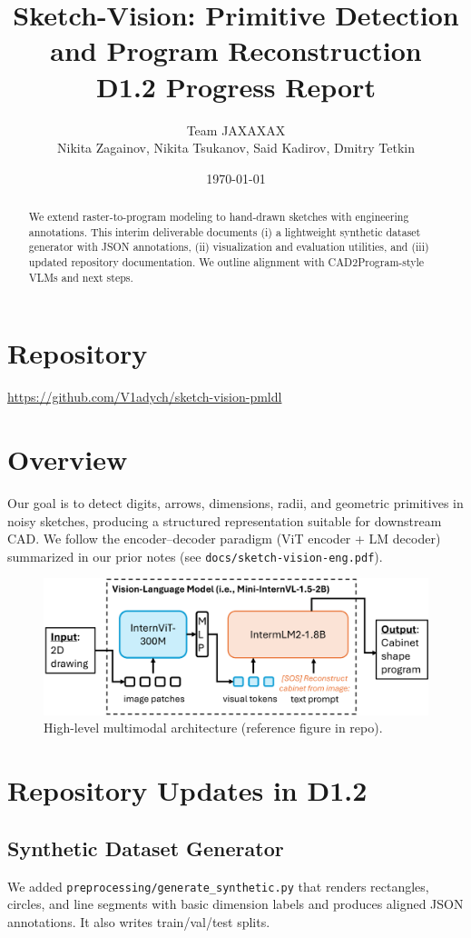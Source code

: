 \documentclass[11pt,a4paper]{article}
\title{Sketch-Vision: Primitive Detection and Program Reconstruction\\\large D1.2 Progress Report}
\author{Team JAXAXAX\\Nikita Zagainov, Nikita Tsukanov, Said Kadirov, Dmitry Tetkin}
\date{\today}
\begin{document}
\maketitle

\begin{abstract}
We extend raster-to-program modeling to hand-drawn sketches with engineering annotations. This interim deliverable documents (i) a lightweight synthetic dataset generator with JSON annotations, (ii) visualization and evaluation utilities, and (iii) updated repository documentation. We outline alignment with CAD2Program-style VLMs and next steps.
\end{abstract}

\section{Repository}
\url{https://github.com/V1adych/sketch-vision-pmldl}

\section{Overview}
Our goal is to detect digits, arrows, dimensions, radii, and geometric primitives in noisy sketches, producing a structured representation suitable for downstream CAD. We follow the encoder--decoder paradigm (ViT encoder + LM decoder) summarized in our prior notes (see \texttt{docs/sketch-vision-eng.pdf}).

\begin{figure}[!htbp]
  \centering
  \includegraphics[width=0.9\linewidth]{internvl.png}
  \caption{High-level multimodal architecture (reference figure in repo).}\label{fig:internvl}
\end{figure}

\section{Repository Updates in D1.2}
\subsection{Synthetic Dataset Generator}
We added \texttt{preprocessing/generate\_synthetic.py} that renders rectangles, circles, and line segments with basic dimension labels and produces aligned JSON annotations. It also writes train/val/test splits.
\end{document}
